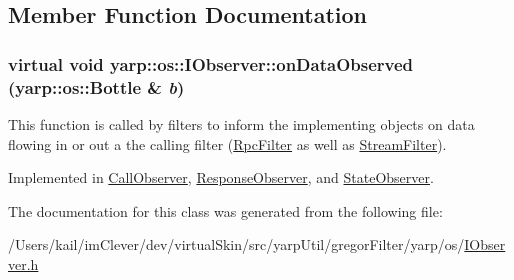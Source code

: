 \subsection{Member Function Documentation}
\hypertarget{classyarp_1_1os_1_1_i_observer_a4829e5a6f2ba6666b9539a4a30f20790}{
\subsubsection[{onDataObserved}]{\setlength{\rightskip}{0pt plus 5cm}virtual void yarp::os::IObserver::onDataObserved (yarp::os::Bottle \& {\em b})}}
\label{classyarp_1_1os_1_1_i_observer_a4829e5a6f2ba6666b9539a4a30f20790}
This function is called by filters to inform the implementing objects on data flowing in or out a the calling filter (\hyperlink{classyarp_1_1os_1_1_rpc_filter}{RpcFilter} as well as \hyperlink{classyarp_1_1os_1_1_stream_filter}{StreamFilter}). 

Implemented in \hyperlink{class_call_observer_abc1974fe2f04101dbbb1ae3ce83e7bfe}{CallObserver}, \hyperlink{class_response_observer_a2d847c448b31b5aa880b9282f7bf223d}{ResponseObserver}, and \hyperlink{class_state_observer_af104fa553abf31754d9acc084e9aa31f}{StateObserver}.

The documentation for this class was generated from the following file:\begin{DoxyCompactItemize}
\item 
/Users/kail/imClever/dev/virtualSkin/src/yarpUtil/gregorFilter/yarp/os/\hyperlink{_i_observer_8h}{IObserver.h}\end{DoxyCompactItemize}
